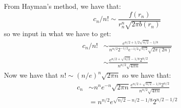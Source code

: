 \documentclass[]{article}
\begin{document}
From Hayman's method, we have that:
\begin{equation}
	c_n/n! \sim \frac{f(r_n)}{r_n^n \sqrt{2 \pi b(r_n)}}
\end{equation}
so we input in what we have to get:
\begin{align}
	c_n/n! &\sim \frac{e^{n/2 + 1/2 \sqrt{n/2} - 1/8}}{n^{n/2} 2^{-1/2} e^{-1/2 \sqrt{n/2}} \sqrt{2 \pi (2n)}}\\
	&\sim 
	\frac{e^{n/2 + \sqrt{n/2} - 1/8} 2^{n/2}}{n^{n/2} \sqrt{4 \pi n}}
\end{align}
Now we have that $n! \sim (n/e)^n \sqrt{2 \pi n}$ so we have that:
\begin{align}
	c_n &\sim n^n e^{-n} \sqrt{2 \pi n}\frac{e^{n/2 + \sqrt{n/2} - 1/8} 2^{n/2}}{n^{n/2} \sqrt{4 \pi n}}\\
	&=
	n^{n/2} e^{\sqrt{n/2} - n/2 - 1/8} 2^{n/2 - 1/2}
\end{align}
\end{document}
